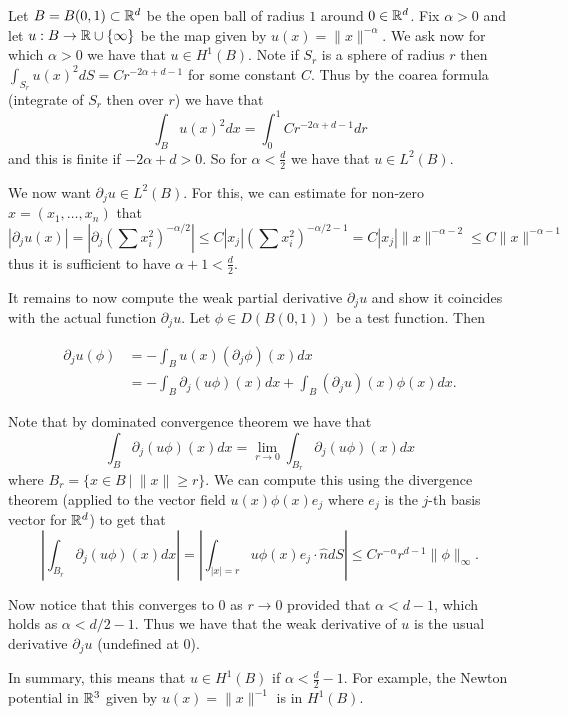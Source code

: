 \documentclass[twoside, a4paper, 10pt]{amsart}
\begin{document}
\begin{eg} Let $B = B(0,1) \subset \mathbb{R}^d$ be the open ball of radius $1$ around $0 \in \mathbb{R}^d$. Fix $\alpha>0$ and let $u:B \to \mathbb{R} \cup \{ \infty\}$ be the map given by $u(x) = \|x\|^{-\alpha}$. We ask now for which $\alpha>0$ we have that $u \in H^1(B)$. Note if $S_r$ is a sphere of radius $r$ then $\int_{S_r} u(x)^2 dS = C r^{-2\alpha + d-1}  $ for some constant $C$. Thus by the coarea formula (integrate of $S_r$ then over $r$) we have that $$\int_B u(x)^2 dx = \int_0^1 Cr^{-2\alpha + d -1} dr $$ and this is finite if $-2\alpha + d >0$. So for $\alpha < \frac{d}{2}$ we have that $u \in L^2(B)$. 

 We now want $\partial_j u \in L^2(B)$. For this, we can estimate for non-zero $x =(x_1, \ldots, x_n)$ that $$|\partial_j u(x)| = |\partial_j (\sum x_i^2)^{-\alpha/2}| \leq C |x_j| (\sum x_i^2 )^{-\alpha/2 - 1} =C |x_j| \|x\|^{-\alpha - 2}  \leq C \|x\|^{-\alpha - 1}$$ thus it is sufficient to have $\alpha + 1 < \frac{d}{2}$.

It remains to now compute the weak partial derivative $\partial_j u$ and show it coincides with the actual function $\partial_j u$. Let $\phi \in D(B(0,1))$ be a test function. Then 

\begin{align*} \partial_j u (\phi) &= - \int_B u(x) (\partial_j \phi)(x) dx \\ &= -\int_B \partial_j (u \phi)(x) dx + \int_B (\partial_j u)(x) \phi(x) dx. \end{align*}

Note that by dominated convergence theorem we have that $$\int_B \partial_j (u \phi)(x) dx = \lim_{r \to 0} \int_{B_r} \partial_j(u \phi)(x) dx$$ where $B_r = \{ x \in B ~|~ \|x\| \geq r \}$. We can compute this using the divergence theorem (applied to the vector field $u(x)\phi(x) e_j$ where $e_j$ is the $j$-th basis vector for $\mathbb{R}^d$) to get that $$\left| \int_{B_r} \partial_j(u \phi)(x) dx \right| = \left| \int_{|x| = r} u \phi(x) e_j \cdot \hat{n} dS \right| \leq C r^{-\alpha} r^{d-1} \|\phi\|_{\infty}. $$

Now notice that this converges to $0$ as $r \to 0$ provided that $\alpha < d-1$, which holds as $\alpha < d/2 - 1$. Thus we have that the weak derivative of $u$ is the usual derivative $\partial_j u$ (undefined at $0$).

In summary, this means that $u \in H^1(B)$ if $\alpha < \frac{d}{2} - 1$. For example, the Newton potential in $\mathbb{R}^3$ given by $u(x) = \|x\|^{-1}$ is in $H^1(B)$.

\end{eg}
\end{document}
